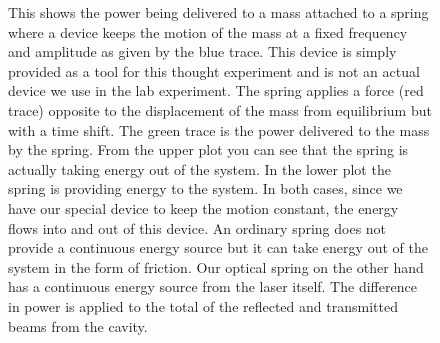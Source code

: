 \begin{figure}
\centering
{}
\caption[Damped Spring Energy Flow]{This shows the power being delivered to a mass
  attached to a spring where a device keeps the motion of the mass at a fixed
  frequency and amplitude as given by the blue trace.
  This device is simply provided as a tool for this thought experiment and is
  not an actual device we use in the lab experiment.
  The spring applies a force (red trace) opposite to the displacement of the mass
  from equilibrium but with a time shift.
  The green trace is the power delivered to the mass by the spring.
  From the upper plot you can see that the spring is actually taking energy out
  of the system.
  In the lower plot the spring is providing energy to the system.
  In both cases, since we have our special device to keep the motion constant,
  the energy flows into and out of this device.
  An ordinary spring does not provide a continuous energy source but it can take
  energy out of the system in the form of friction.
  Our optical spring on the other hand has a continuous energy source from the
  laser itself.
  The difference in power is applied to the total of the reflected and
  transmitted beams from the cavity.
  }
\label{fig:otstabletime}
\end{figure}

